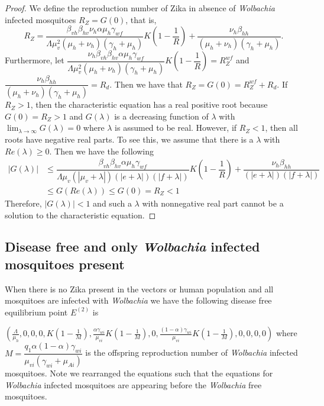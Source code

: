 \documentclass{ws-rv9x6}
\begin{document}
\begin{proof}
We define the reproduction number of Zika in absence of \textit{Wolbachia} infected mosquitoes $R_Z=G(0)$, that is,
$$R_Z=\dfrac{\beta_{vh}\beta_{hv}\nu_h\alpha\mu_h\gamma_{wf}}{\Lambda\mu^2_v(\mu_h+\nu_h)(\gamma_h+\mu_h)}K\left(1-\dfrac{1}{R}\right)
    +\dfrac{\nu_h\beta_{hh}}{(\mu_h+\nu_h)(\gamma_h+\mu_h)}.$$
Furthermore, let $\dfrac{\nu_h\beta_{vh}\beta_{hv}\alpha\mu_h\gamma_{wf}}{\Lambda\mu^2_v(\mu_h+\nu_h)(\gamma_h+\mu_h)}K\left(1-\dfrac{1}{R}\right)=R^{wf}_Z$ and $\dfrac{\nu_h\beta_{hh}}{(\mu_h+\nu_h)(\gamma_h+\mu_h)}=R_d$. Then we have that $R_Z=G(0)=R^{wf}_Z+R_d.$ 
If $R_Z>1$, then the characteristic equation has a real positive root because $G(0)=R_Z>1$ and $G(\lambda)$ is a decreasing function of $\lambda$ with $\lim_{\lambda \to \infty}G(\lambda)=0$ where $\lambda$ is assumed to be real. However, if $R_Z<1$, then all roots have negative real parts. To see this, we assume that there is a $\lambda$ with $Re(\lambda) \geq 0$. Then we have the following
\begin{align*}
|G(\lambda)|&\leq \dfrac{\beta_{vh}\beta_{hv}\alpha\mu_h\gamma_{wf}}{\Lambda\mu_v(|\mu_v+\lambda|) (|e+\lambda|) (|f+\lambda|)}K\left(1-\dfrac{1}{R}\right)+\dfrac{\nu_h\beta_{hh}}{(|e+\lambda|) (|f+\lambda|)}\\
& \leq G(Re(\lambda)) \leq G(0)=R_Z <1
\end{align*}
Therefore, $|G(\lambda)|<1$ and such a $\lambda$ with nonnegative real part cannot be a solution to the characteristic equation.
\end{proof}

\subsection{Disease free and only \textit{Wolbachia} infected mosquitoes present}
When there is no Zika present in the vectors or human population and all  mosquitoes are infected with \textit{Wolbachia} we have the following disease free equilibrium point $E^{(2)}$ is

\noindent $\left(\frac{\Lambda}{\mu_h},0,0,0,K\left(1-\frac{1}{M}\right),\frac{\alpha\gamma_{wi}}{\mu_{vi}}K\left(1-\frac{1}{M}\right),0,\frac{(1-\alpha)\gamma_{wi}}{\mu_{vi}}K\left(1-\frac{1}{M}\right),0,0,0,0\right)$ where $M=\dfrac{q_1 \alpha (1-\alpha)\gamma_{wi}}{\mu_{vi} (\gamma_{wi}+\mu_{Ai})}$ is the offspring reproduction number of \textit{Wolbachia} infected mosquitoes. Note we rearranged the equations such that the equations for \textit{Wolbachia} infected mosquitoes are appearing before the \textit{Wolbachia} free mosquitoes.
\end{document}
